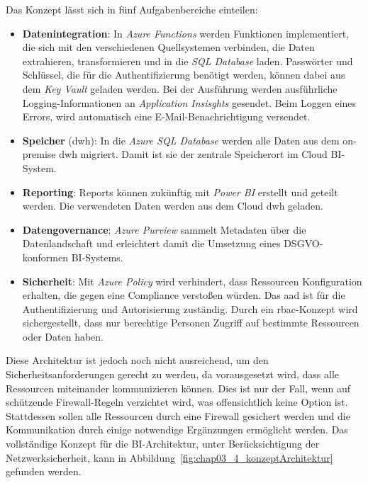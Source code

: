 Das Konzept lässt sich in fünf Aufgabenbereiche einteilen:
\begin{itemize}
\item \textbf{Datenintegration}: In \textit{Azure Functions} werden Funktionen implementiert, die sich mit den verschiedenen Quellsystemen verbinden, die Daten extrahieren, transformieren und in die \textit{SQL Database} laden. Passwörter und Schlüssel, die für die Authentifizierung benötigt werden, können dabei aus dem \textit{Key Vault} geladen werden. Bei der Ausführung werden ausführliche Logging-Informationen an \textit{Application Insisghts} gesendet. Beim Loggen eines Errors, wird automatisch eine E-Mail-Benachrichtigung versendet.
\item \textbf{Speicher} (\ac{dwh}): In die \textit{Azure SQL Database} werden alle Daten aus dem on-premise \ac{dwh} migriert. Damit ist sie der zentrale Speicherort im Cloud BI-System.
\item \textbf{Reporting}: Reports können zukünftig mit \textit{Power BI} erstellt und geteilt werden. Die verwendeten Daten werden aus dem Cloud \ac{dwh} geladen. 
\item \textbf{Datengovernance}: \textit{Azure Purview} sammelt Metadaten über die Datenlandschaft und erleichtert damit die Umsetzung eines DSGVO-konformen BI-Systems.
\item \textbf{Sicherheit}: Mit \textit{Azure Policy} wird verhindert, dass Ressourcen Konfiguration erhalten, die gegen eine Compliance verstoßen würden. Das \ac{aad} ist für die Authentifizierung und Autorisierung zuständig. Durch ein \ac{rbac}-Konzept wird sichergestellt, dass nur berechtige Personen Zugriff auf bestimmte Ressourcen oder Daten haben. 
\end{itemize}

Diese Architektur ist jedoch noch nicht ausreichend, um den Sicherheitsanforderungen gerecht zu werden, da vorausgesetzt wird, dass alle Ressourcen miteinander kommunizieren können. Dies ist nur der Fall, wenn auf schützende Firewall-Regeln verzichtet wird, was offensichtlich keine Option ist. Stattdessen sollen alle Ressourcen durch eine Firewall gesichert werden und die Kommunikation durch einige notwendige Ergänzungen ermöglicht werden. Das vollständige Konzept für die BI-Architektur, unter Berücksichtigung der Netzwerksicherheit, kann in Abbildung~\ref{fig:chap03_4_konzeptArchitektur} gefunden werden.
 

